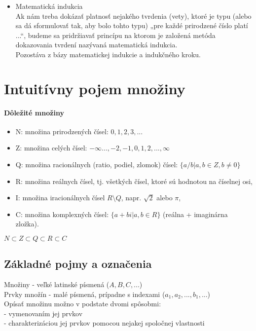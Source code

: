 \begin{itemize}
    \item Matematická indukcia\\
      Ak nám treba dokázať platnosť nejakého tvrdenia (vety), ktoré je typu (alebo sa dá sformulovať tak, aby bolo tohto typu) „pre každé prirodzené číslo platí ...“, budeme sa pridržiavať princípu na ktorom je založená metóda dokazovania tvrdení nazývaná matematická indukcia.\\
      Pozostáva z bázy matematickej indukcie a indukčného kroku.
    \end{itemize}

\section{Intuitívny pojem množiny}
 \paragraph{Dôležité množiny}
  \begin{itemize}
  \item N: množina prirodzených čísel: $0, 1, 2, 3, . . .$
  \item Z: množina celých čísel: $-\infty . . . , -2, -1, 0, 1, 2, . . . ,\infty$
  \item Q: množina racionálnych (ratio, podiel, zlomok) čísel: $\{a/b| a, b \in Z, b \neq 0\}$
  \item R: množina reálnych čísel, tj. všetkých čísel, ktoré sú hodnotou na číselnej osi,
  \item I: množina iracionálnych čísel $R \setminus Q$, napr. $\sqrt{2}$ alebo $\pi$,
  \item C: množina komplexných čísel: $\{ a + bi | a, b \in R\}$ (reálna + imaginárna zložka).
  \end{itemize}
  $N \subset Z \subset Q \subset R \subset C$
  \subsection{Základné pojmy a označenia}
  	Množiny - veľké latinské písmená ($A, B, C, ...$)\\
  	Prvky množín - malé písmená, prípadne s indexami ($a_{1}, a_{2}, ..., b_{1}, ...$)\\

	Opísať množinu možno v podstate dvomi spôsobmi:\\
	- vymenovaním jej prvkov\\
	- charakterizáciou jej prvkov pomocou nejakej spoločnej vlastnosti\\


